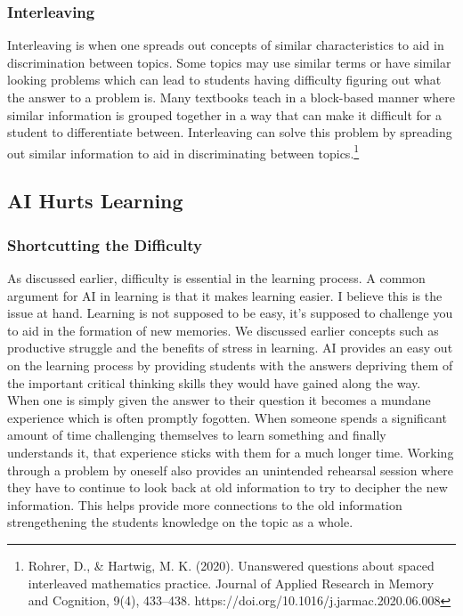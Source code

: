 \documentclass{article}[12pt]
\begin{document}
\subsubsection{Interleaving}
Interleaving is when one spreads out concepts of similar characteristics to aid in discrimination between topics. Some topics may use similar terms or have similar looking problems which can lead to students having difficulty figuring out what the answer to a problem is. Many textbooks teach in a block-based manner where similar information is grouped together in a way that can make it difficult for a student to differentiate between. Interleaving can solve this problem by spreading out similar information to aid in discriminating between topics.\footnote{\raggedright Rohrer, D., \& Hartwig, M. K. (2020). Unanswered questions about spaced interleaved mathematics practice. Journal of Applied Research in Memory and Cognition, 9(4), 433–438. https://doi.org/10.1016/j.jarmac.2020.06.008}

\subsection{AI Hurts Learning}
\subsubsection{Shortcutting the Difficulty}
As discussed earlier, difficulty is essential in the learning process. A common argument for AI in learning is that it makes learning easier. I believe this is the issue at hand. Learning is not supposed to be easy, it's supposed to challenge you to aid in the formation of new memories. We discussed earlier concepts such as productive struggle and the benefits of stress in learning. AI provides an easy out on the learning process by providing students with the answers depriving them of the important critical thinking skills they would have gained along the way. When one is simply given the answer to their question it becomes a mundane experience which is often promptly fogotten. When someone spends a significant amount of time challenging themselves to learn something and finally understands it, that experience sticks with them for a much longer time. Working through a problem by oneself also provides an unintended rehearsal session where they have to continue to look back at old information to try to decipher the new information. This helps provide more connections to the old information strengethening the students knowledge on the topic as a whole.
\end{document}
